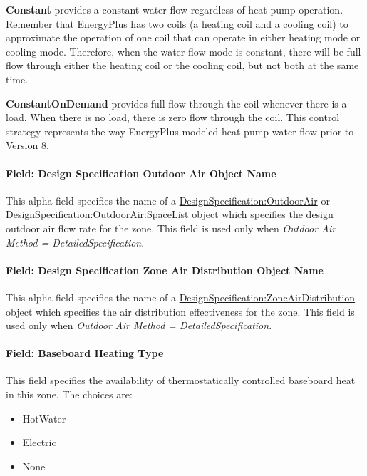 \textbf{Constant} provides a constant water flow regardless of heat pump operation. Remember that EnergyPlus has two coils (a heating coil and a cooling coil) to approximate the operation of one coil that can operate in either heating mode or cooling mode. Therefore, when the water flow mode is constant, there will be full flow through either the heating coil or the cooling coil, but not both at the same time.

\textbf{ConstantOnDemand} provides full flow through the coil whenever there is a load. When there is no load, there is zero flow through the coil. This control strategy represents the way EnergyPlus modeled heat pump water flow prior to Version 8.

\paragraph{Field: Design Specification Outdoor Air Object Name}\label{field-design-specification-outdoor-air-object-name-5}

This alpha field specifies the name of a \hyperref[designspecificationoutdoorair]{DesignSpecification:OutdoorAir} or \hyperref[designspecificationoutdoorairspacelist]{DesignSpecification:OutdoorAir:SpaceList} object which specifies the design outdoor air flow rate for the zone. This field is used only when \emph{Outdoor Air Method = DetailedSpecification}.

\paragraph{Field: Design Specification Zone Air Distribution Object Name}\label{field-design-specification-zone-air-distribution-object-name-4}

This alpha field specifies the name of a \hyperref[designspecificationzoneairdistribution]{DesignSpecification:ZoneAirDistribution} object which specifies the air distribution effectiveness for the zone. This field is used only when \emph{Outdoor Air Method = DetailedSpecification}.

\paragraph{Field: Baseboard Heating Type}\label{field-baseboard-heating-type-4}

This field specifies the availability of thermostatically controlled baseboard heat in this zone. The choices are:

\begin{itemize}
\item
  HotWater
\item
  Electric
\item
  None
\end{itemize}

